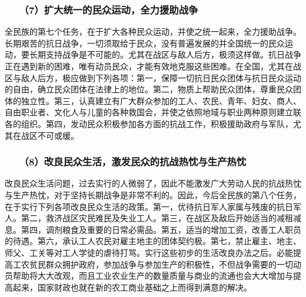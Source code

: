 \documentclass[cn,11pt,chinese]{elegantbook}
\def\myformat#1{\hfil\hfil #1}
\begin{document}
\subsubsection*{\myformat{　　（7）扩大统一的民众运动，全力援助战争}}
全民族的第七个任务，在于扩大各种民众运动，并使之统一起来，全力援助战争。长期艰苦的抗日战争，一切须取给于民众，没有普遍发展的并全国统一的民众运动，要长期支持战争是不可能的。尤其在战区与敌人后方，极须这样做。抗日战争正在遇到新的困难，唯有动员民众，才能有效地克服这些困难。在全国，尤其在战区与敌人后方，极应做到下列各项：第一，保障一切抗日民众团体与抗日民众运动的自由，确立民众团体在法律上的地位。第二，物质上帮助民众团体，尊重民众团体的独立性。第三，认真建立有广大群众参加的工人、农民、青年、妇女、商人、自由职业者、文化人与儿童的各种救国会，并使之依照地域与职业两种原则建立联各的组织。第四，发动民众积极参加各方面的抗战工作，积极援助政府与军队，尤其在战区不可或缓。\\
\subsubsection*{\myformat{　　（8）改良民众生活，激发民众的抗战热忱与生产热忱}}
改良民众生活问题，过去实行的人微弱了，因此不能激发广大劳动人民的抗战热忱与生产热忱，对于坚持长期战争是非常不利的。因此，今后全民族的第八个任务，在于实行下列各项改良民众生活的政策。第一，优待抗日军人家属与残废的抗日军人。第二，救济战区灾民难民及失业工人。第三，在战区及敌后开始适当的减租减息。第四，调剂粮食及重要的日常必需品。第五，适当的增加工资，改善工人职员的待遇。第六，承认工人农民对雇主地主的团体契约极。第七，禁止雇主、地主、师父、工关等对工人学徒的虐待打骂。实行这些初步的生活改良办法之后。必能提高工农贫民群众拥护政府，参加战争与参加生产的积极性，不但战争需要的一切动员帮助将大大改观，而且工业农业生产的数量质量与商业的流通也会大大增加与提高起来，国家财政也就在新的农工商业基础之上而得到满意的解决。\\
\end{document}
